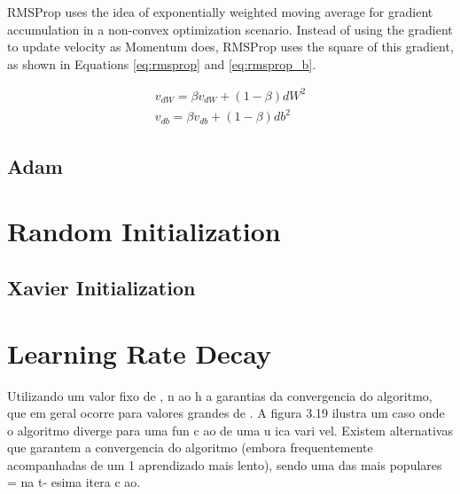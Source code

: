 RMSProp \cite{hinton2012} uses the idea of exponentially weighted moving average for gradient accumulation in a non-convex optimization scenario. Instead of using the gradient to update velocity as Momentum does, RMSProp uses the square of this gradient, as shown in Equations \ref{eq:rmsprop} and \ref{eq:rmsprop_b}.


\begin{align}\label{eq:rmsprop}
v_{dW} = \beta v_{dW} + (1 - \beta)dW^2\\
v_{db} = \beta v_{db} + (1 - \beta)db^2
\label{eq:rmsprop_b}
\end{align}

\subsection{Adam}

\section{Random Initialization}
\subsection{Xavier Initialization}

\section{Learning Rate Decay}

Utilizando um valor fixo de , n ao h a garantias da convergencia do
algoritmo, que em geral ocorre para valores grandes de . A figura 3.19 ilustra um caso
onde o algoritmo diverge para uma fun c ao de uma u
ica vari vel. Existem alternativas
que garantem a convergencia do algoritmo (embora frequentemente acompanhadas de um
1
aprendizado mais lento), sendo uma das mais populares  = na t- esima itera c ao.
